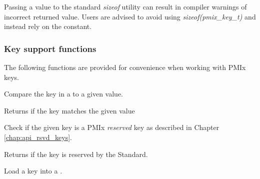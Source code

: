 Passing a  value to the standard \textit{sizeof} utility can result in compiler warnings of incorrect returned value. Users are advised to avoid using \textit{sizeof(pmix_key_t)} and instead rely on the  constant.
\adviceuserend

\subsubsection{Key support functions}

The following functions are provided for convenience when working with \ac{PMIx} keys.


Compare the key in a  to a given value.


\begin{arglist}
\end{arglist}

Returns  if the key matches the given value


Check if the given key is a \ac{PMIx} \emph{reserved} key as described in Chapter \ref{chap:api_rsvd_keys}.


\begin{arglist}
\end{arglist}

Returns  if the key is reserved by the Standard.


Load a key into a .


